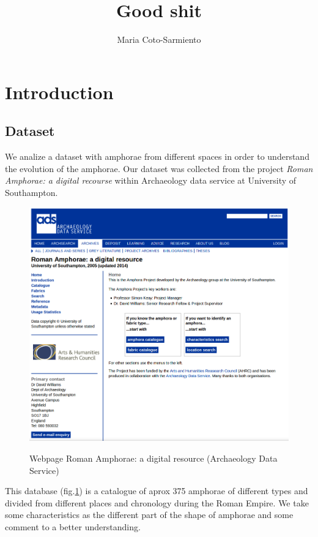 \documentclass[10pt,a4paper]{article}
\author{Maria Coto-Sarmiento}
\title{Good shit}
\begin{document}
\maketitle

\section{Introduction}




\subsection{Dataset}

We analize a dataset with amphorae from different spaces in order to understand the evolution of the amphorae. Our dataset was collected from the project \emph{Roman Amphorae: a digital recourse} within Archaeology data service at University of Southampton. \\

\begin{figure}[hbp]
	\centering
\includegraphics[scale=0.30]{picture1.png}
\label{picwebarch}
\caption{Webpage Roman Amphorae: a digital resource (Archaeology Data Service)}
\end{figure} 


This database (fig.\ref{picwebarch}) is a catalogue of aprox 375 amphorae of different types and divided from different places and chronology during the Roman Empire. We take some characteristics as the different part of the shape of amphorae and some comment to a better understanding. 
\end{document}
